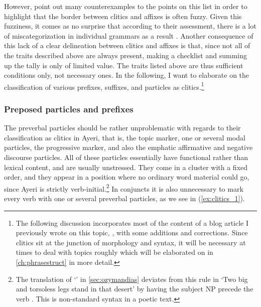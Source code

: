 However, \citet{spencerluis2012} point out many counterexamples to the points
on this list in order to highlight that the border between clitics and affixes
is often fuzzy. Given this fuzziness, it comes as no surprise that according to
their assessment, there is a lot of miscategorization in individual grammars as
a result \citep[107]{spencerluis2012}. Another consequence of this lack of a
clear delineation between clitics and affixes is that, since not all of the
traits described above are always present, making a checklist and summing up
the tally is only of limited value. The traits listed above are thus sufficient
conditions only, not necessary ones. In the following, I want to elaborate on
the classification of various prefixes, suffixes, and particles as
clitics.\footnote{The following discussion incorporates most of the content of
a blog article I previously wrote on this topic, \citet{benung:clitics}, with
some additions and corrections. Since clitics sit at the junction of morphology
and syntax, it will be necessary at times to deal with topics roughly which
will be elaborated on in \autoref{ch:phrasestruct} in more detail.}

\subsubsection{Preposed particles and prefixes}

\label{clitics_preverb} The preverbal particles should be rather unproblematic 
with regards to their classification as clitics in Ayeri, that is,
the topic marker, one or several modal
particles, the progressive marker, and
also the emphatic affirmative and negative discourse particles. All of these particles essentially have functional rather than
lexical content, and are usually unstressed. They come in a cluster with a fixed
order, and they appear in a position where no ordinary word material could go,
since Ayeri is strictly verb-initial.\footnote{The translation of
`' in \autoref{sec:ozymandias} deviates from this
rule in 
  `Two big and torsoless legs stand in that desert' by having the
subject NP  precede the verb
. This is non-standard syntax in a poetic
text.} In conjuncts it is also unnecessary to mark every verb with one or
several preverbal particles, as we see in (\ref{ex:clitics_1}).

